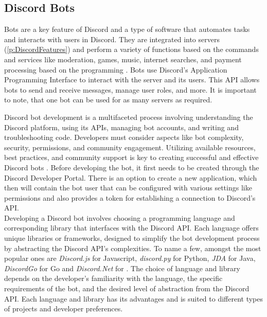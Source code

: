 \subsection{Discord Bots}
\label{ssec:DiscordBots}
Bots are a key feature of Discord and a type of software that automates tasks and interacts with users in Discord. They are integrated into servers (\ref{p:DiscordFeatures}) and perform a variety of functions based on the commands and services like moderation, games, music, internet searches, and payment processing based on the programming \citep{agnihotri2022discord}. Bots use Discord's Application Programming Interface to interact with the server and its users. This API allows bots to send and receive messages, manage user roles, and more. It is important to note, that one bot can be used for as many servers as required.

Discord bot development is a multifaceted process involving understanding the Discord platform, using its APIs, managing bot accounts, and writing and troubleshooting code. Developers must consider aspects like bot complexity, security, permissions, and community engagement. Utilizing available resources, best practices, and community support is key to creating successful and effective Discord bots \citep{ToptalDevelopersDiscordBot}. Before developing the bot, it first needs to be created through the Discord Developer Portal. There is an option to create a new application, which then will contain the bot user that can be configured with various settings like permissions and also provides a token for establishing a connection to Discord's API.\\

Developing a Discord bot involves choosing a programming language and corresponding library that interfaces with the Discord API. Each language offers unique libraries or frameworks, designed to simplify the bot development process by abstracting the Discord API's complexities. To name a few, amongst the most popular ones are \textit{Discord.js} for Javascript, \textit{discord.py} for Python, \textit{JDA} for Java, \textit{DiscordGo} for Go and \textit{Discord.Net} for \csharp. The choice of language and library depends on the developer's familiarity with the language, the specific requirements of the bot, and the desired level of abstraction from the Discord API. Each language and library has its advantages and is suited to different types of projects and developer preferences.\\

